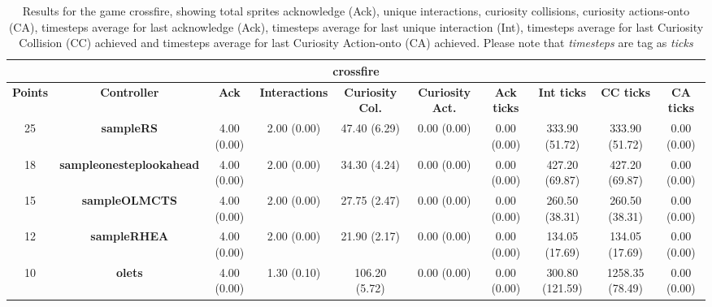 \begin{table*}[!t]
\begin{center}
\begin{adjustbox}{width=1\textwidth}
\begin{tabular}{|c|c|c|c|c|c|c|c|c|c|}
\multicolumn{10}{c}{\textbf{crossfire}}\\
\hline
\textbf{Points} & \textbf{Controller} & \textbf{Ack} & \textbf{Interactions} & \textbf{Curiosity Col.} & \textbf{Curiosity Act.} & \textbf{Ack ticks} & \textbf{Int ticks} & \textbf{CC ticks} & \textbf{CA ticks}\\
\hline
25 & \textbf{sampleRS} & 4.00 (0.00) & 2.00 (0.00) & 47.40 (6.29) & 0.00 (0.00) & 0.00 (0.00) & 333.90 (51.72) & 333.90 (51.72) & 0.00 (0.00)
 \\
\hline
18 & \textbf{sampleonesteplookahead} & 4.00 (0.00) & 2.00 (0.00) & 34.30 (4.24) & 0.00 (0.00) & 0.00 (0.00) & 427.20 (69.87) & 427.20 (69.87) & 0.00 (0.00)
 \\
\hline
15 & \textbf{sampleOLMCTS} & 4.00 (0.00) & 2.00 (0.00) & 27.75 (2.47) & 0.00 (0.00) & 0.00 (0.00) & 260.50 (38.31) & 260.50 (38.31) & 0.00 (0.00)
 \\
\hline
12 & \textbf{sampleRHEA} & 4.00 (0.00) & 2.00 (0.00) & 21.90 (2.17) & 0.00 (0.00) & 0.00 (0.00) & 134.05 (17.69) & 134.05 (17.69) & 0.00 (0.00)
 \\
\hline
10 & \textbf{olets} & 4.00 (0.00) & 1.30 (0.10) & 106.20 (5.72) & 0.00 (0.00) & 0.00 (0.00) & 300.80 (121.59) & 1258.35 (78.49) & 0.00 (0.00)
 \\
\hline
\end{tabular}
\end{adjustbox}
\caption{Results for the game crossfire, showing total sprites acknowledge (Ack), unique interactions, curiosity collisions, curiosity actions-onto (CA), timesteps average for last acknowledge (Ack),  timesteps average for last unique interaction (Int), timesteps average for last Curiosity Collision (CC) achieved and timesteps average for last Curiosity Action-onto (CA) achieved. Please note that \textit{timesteps} are tag as \textit{ticks}}
\label{tab:weights}
\end{center}
\end{table*}
